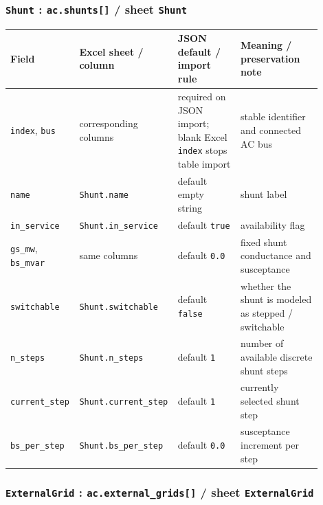 \subsubsection*{\texttt{Shunt} : \texttt{ac.shunts[]} / sheet \texttt{Shunt}}

\begin{longtable}{L{0.20\linewidth}L{0.24\linewidth}L{0.20\linewidth}L{0.26\linewidth}}
\toprule
Field & Excel sheet / column & JSON default / import rule & Meaning / preservation note \\
\midrule
\endhead
\texttt{index}, \texttt{bus} & corresponding columns & required on JSON import; blank Excel \texttt{index} stops table import & stable identifier and connected AC bus \\
\texttt{name} & \texttt{Shunt.name} & default empty string & shunt label \\
\texttt{in\_service} & \texttt{Shunt.in\_service} & default \texttt{true} & availability flag \\
\texttt{gs\_mw}, \texttt{bs\_mvar} & same columns & default \texttt{0.0} & fixed shunt conductance and susceptance \\
\texttt{switchable} & \texttt{Shunt.switchable} & default \texttt{false} & whether the shunt is modeled as stepped / switchable \\
\texttt{n\_steps} & \texttt{Shunt.n\_steps} & default \texttt{1} & number of available discrete shunt steps \\
\texttt{current\_step} & \texttt{Shunt.current\_step} & default \texttt{1} & currently selected shunt step \\
\texttt{bs\_per\_step} & \texttt{Shunt.bs\_per\_step} & default \texttt{0.0} & susceptance increment per step \\
\bottomrule
\end{longtable}

\subsubsection*{\texttt{ExternalGrid} : \texttt{ac.external\_grids[]} / sheet \texttt{ExternalGrid}}

